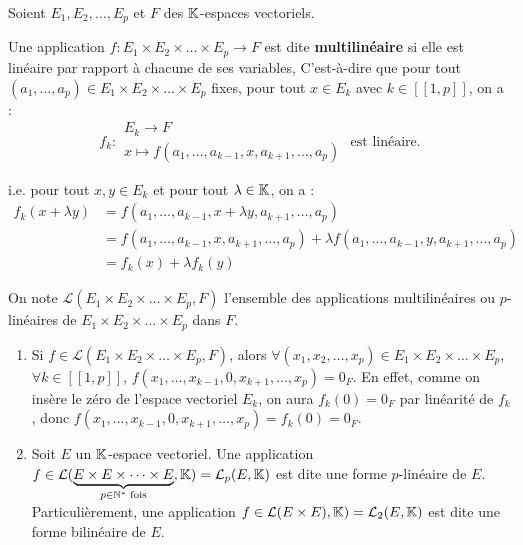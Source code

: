 \documentclass[12pt, a4paper]{report}
\begin{document}
\begin{definition}
    Soient $E_1, E_2, \dots, E_p$ et $F$ des $\mathbb{K}$-espaces vectoriels.
    
    Une application $f : E_1 \times E_2 \times \dots \times E_p \to F$ est dite \textbf{multilinéaire} si elle est linéaire par rapport à chacune de ses variables, C'est-à-dire que pour tout $(a_1,\dots,a_p) \in E_1 \times E_2 \times \dots \times E_p$ fixes, pour tout $x \in E_k$ avec $k \in [\![1,p]\!]$, on a :
    $$f_k : \begin{matrix} E_k \to F \\ x \mapsto f(a_1, \dots, a_{k-1}, x, a_{k+1}, \dots, a_p) \end{matrix} \text{ est linéaire.}$$

    i.e. pour tout $x,y \in E_k$ et pour tout $\lambda \in \mathbb{K}$, on a :
    \begin{align*}
        f_k(x+\lambda y) &= f(a_1, \dots, a_{k-1}, x + \lambda y, a_{k+1}, \dots, a_p) \\
        &= f(a_1, \dots, a_{k-1}, x, a_{k+1}, \dots, a_p) + \lambda f(a_1, \dots, a_{k-1}, y, a_{k+1}, \dots, a_p) \\
        &= f_k(x) + \lambda f_k(y)
    \end{align*}

    On note $\mathcal{L}(E_1\times E_2 \times \dots \times E_p, F)$ l'ensemble des applications multilinéaires ou $p$-linéaires de $E_1 \times E_2 \times \dots \times E_p$ dans $F$.
\end{definition}

\begin{remark}
    \begin{enumerate}
        \item Si $f \in \mathcal L(E_1\times E_2 \times \dots \times E_p, F)$, alors $\forall (x_1, x_2, \dots, x_p) \in E_1 \times E_2 \times \dots \times E_p$, $\forall k \in [\![1,p]\!]$, $f(x_1, \dots, x_{k-1}, 0, x_{k+1}, \dots, x_p) = 0_F$. En effet, comme on insère le zéro de l'espace vectoriel $E_k$, on aura $f_k(0) = 0_F$ par linéarité de $f_k$, donc $f(x_1, \dots, x_{k-1}, 0, x_{k+1}, \dots, x_p) = f_k(0) = 0_F$.
        \item Soit $E$ un $\mathbb{K}$-espace vectoriel. Une application $f \in \mathcal L(\underbrace{E\times E \times \dots \times E}_{p \in \mathbb{N}^* \text{ fois}}, \mathbb{K}) = \mathcal L_p(E,\mathbb{K})$ est dite une forme $p$-linéaire de $E$. Particulièrement, une application $f \in \mathcal L(E\times E), \mathbb{K}) = \mathcal L_2(E,\mathbb{K})$ est dite une forme bilinéaire de $E$.
    \end{enumerate}
\end{remark}
\end{document}
